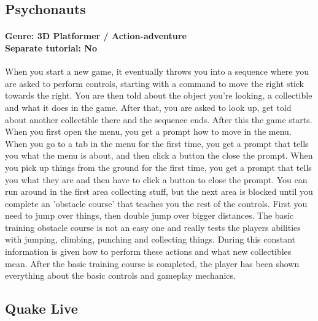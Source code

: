 \subsection{Psychonauts}
\paragraph{Genre: 3D Platformer / Action-adventure \\ Separate tutorial: No \\}
When you start a new game, it eventually throws you into a sequence where you are asked to perform controls, starting with a command to move the right stick towards the right. You are then told about the object you're looking, a collectible and what it does in the game. After that, you are asked to look up, get told about another collectible there and the sequence ends. After this the game starts.
When you first open the menu, you get a prompt how to move in the menu.
When you go to a tab in the menu for the first time, you get a prompt that tells you what the menu is about, and then click a button the close the prompt.
When you pick up things from the ground for the first time, you get a prompt that tells you what they are and then have to click a button to close the prompt.
You can run around in the first area collecting stuff, but the next area is blocked until you complete an 'obstacle course' that teaches you the rest of the controls.
First you need to jump over things, then double jump over bigger distances.
The basic training obstacle course is not an easy one and really tests the players abilities with jumping, climbing, punching and collecting things. During this constant information is given how to perform these actions and what new collectibles mean.
After the basic training course is completed, the player has been shown everything about the basic controls and gameplay mechanics.

\subsection{Quake Live}
